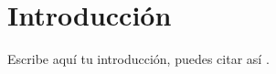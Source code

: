 
\newpage
\clearpage{\pagestyle{empty}\cleardoublepage}
\pagestyle{after-table-of-content}
\chapter*{\centering \large Introducción} 

Escribe aquí tu introducción, puedes citar así \cite{MinisteriodelaProducciondelPeru2018}.
